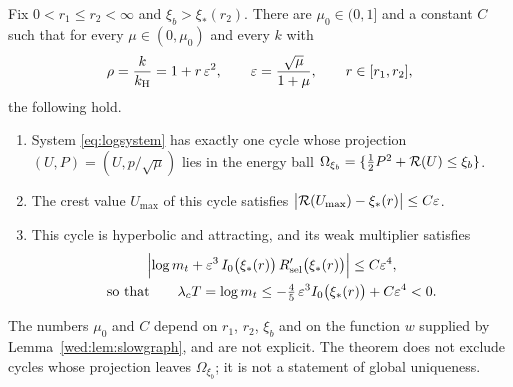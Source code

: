 \fi
\begin{theorem}\label{thm:wedge}
Fix $0<r_1\le r_2<\infty$ and $\xi_b>\xi_*(r_2)$. There are $\mu_0\in(0,1]$ and a constant $C$ such that for every $\mu\in(0,\mu_0)$ and every $k$ with
\[
\rho=\frac{k}{k_{\mathrm H}}=1+r\,\varepsilon^2,\qquad \varepsilon=\frac{\sqrt\mu}{1+\mu},\qquad r\in[r_1,r_2],
\]
the following hold.
\begin{enumerate}[label=\textup{(\roman*)}]
\item System \eqref{eq:logsystem} has exactly one cycle whose projection $(U,P)=(U,p/\sqrt\mu)$ lies in the energy ball $\Omega_{\xi_b}=\{\tfrac12P^2+\mathcal R(U)\le\xi_b\}$.
\item The crest value $U_{\max}$ of this cycle satisfies $\bigl|\mathcal R(U_{\max})-\xi_*(r)\bigr|\le C\varepsilon$.
\item This cycle is hyperbolic and attracting, and its weak multiplier satisfies
\begin{equation}\label{wed:eq:logmt}
\begin{gathered}
\Bigl|\log m_t+\varepsilon^3\,I_0\bigl(\xi_*(r)\bigr)\,R_{\mathrm{sel}}'\bigl(\xi_*(r)\bigr)\Bigr|\le C\varepsilon^4,\\
\text{so that}\qquad
\lambda_cT=\log m_t\le-\tfrac45\,\varepsilon^3I_0\bigl(\xi_*(r)\bigr)+C\varepsilon^4<0 .
\end{gathered}
\end{equation}
\end{enumerate}
The numbers $\mu_0$ and $C$ depend on $r_1$, $r_2$, $\xi_b$ and on the function $w$ supplied by Lemma~\ref{wed:lem:slowgraph}, and are not explicit. The theorem does not exclude cycles whose projection leaves $\Omega_{\xi_b}$; it is not a statement of global uniqueness.
\end{theorem}
